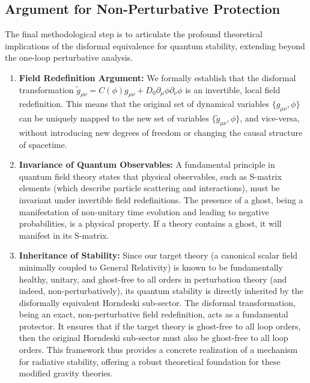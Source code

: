 \documentclass[twocolumn]{aastex631}
\begin{document}
\subsection{Argument for Non-Perturbative Protection}
The final methodological step is to articulate the profound theoretical implications of the disformal equivalence for quantum stability, extending beyond the one-loop perturbative analysis.

\begin{enumerate}
    \item \textbf{Field Redefinition Argument:} We formally establish that the disformal transformation $\tilde{g}_{\mu\nu} = C(\phi) g_{\mu\nu} + D_0 \partial_\mu\phi \partial_\nu\phi$ is an invertible, local field redefinition. This means that the original set of dynamical variables $\{g_{\mu\nu}, \phi\}$ can be uniquely mapped to the new set of variables $\{\tilde{g}_{\mu\nu}, \phi\}$, and vice-versa, without introducing new degrees of freedom or changing the causal structure of spacetime.

    \item \textbf{Invariance of Quantum Observables:} A fundamental principle in quantum field theory states that physical observables, such as S-matrix elements (which describe particle scattering and interactions), must be invariant under invertible field redefinitions. The presence of a ghost, being a manifestation of non-unitary time evolution and leading to negative probabilities, is a physical property. If a theory contains a ghost, it will manifest in its S-matrix.

    \item \textbf{Inheritance of Stability:} Since our target theory (a canonical scalar field minimally coupled to General Relativity) is known to be fundamentally healthy, unitary, and ghost-free to all orders in perturbation theory (and indeed, non-perturbatively), its quantum stability is directly inherited by the disformally equivalent Horndeski sub-sector. The disformal transformation, being an exact, non-perturbative field redefinition, acts as a fundamental protector. It ensures that if the target theory is ghost-free to all loop orders, then the original Horndeski sub-sector must also be ghost-free to all loop orders. This framework thus provides a concrete realization of a mechanism for radiative stability, offering a robust theoretical foundation for these modified gravity theories.
\end{enumerate}
\end{document}
